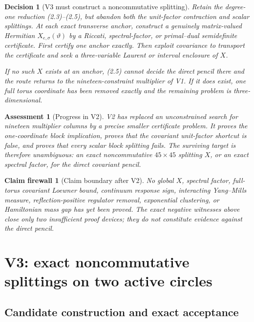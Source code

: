 \documentclass[11pt,oneside]{article}
\newtheorem{assessment}[theorem]{Assessment}
\newtheorem{firewall}[theorem]{Claim firewall}
\newtheorem{decision}[theorem]{Decision}
\theoremstyle{definition}
\theoremstyle{remark}
\begin{document}
\begin{decision}[V3 must construct a noncommutative splitting]
\label{dec:newv2-next}
Retain the degree-one reduction (2.3)--(2.5), but abandon both the
unit-factor contraction and scalar splittings.  At each exact
transverse anchor, construct a genuinely matrix-valued Hermitian
\(X_{e,\sigma}(\vartheta)\) by a Riccati, spectral-factor, or
primal--dual semidefinite certificate.  First certify one anchor
exactly.  Then exploit covariance to transport the certificate and
seek a three-variable Laurent or interval enclosure of \(X\).

If no such \(X\) exists at an anchor, (2.5) cannot decide the direct
pencil there and the route returns to the nineteen-constraint
multiplier of V1.  If it does exist, one full torus coordinate has
been removed exactly and the remaining problem is three-dimensional.
\end{decision}

\begin{assessment}[Progress in V2]
\label{ass:newv2-progress}
V2 has replaced an unconstrained search for nineteen multiplier
columns by a precise smaller certificate problem.  It proves the
one-coordinate block implication, proves that the covariant
unit-factor shortcut is false, and proves that every scalar block
splitting fails.  The surviving target is therefore unambiguous:
an exact noncommutative \(45\times45\) splitting \(X\), or an exact
spectral factor, for the direct covariant pencil.
\end{assessment}

\begin{firewall}[Claim boundary after V2]
\label{fire:newv2-final}
No global \(X\), spectral factor, full-torus covariant Loewner
bound, continuum response sign, interacting Yang--Mills measure,
reflection-positive regulator removal, exponential clustering, or
Hamiltonian mass gap has yet been proved.  The exact negative
witnesses above close only two insufficient proof devices; they do
not constitute evidence against the direct pencil.
\end{firewall}

\section{V3: exact noncommutative splittings on two active circles}
\label{sec:newv3-circles}

\subsection{Candidate construction and exact acceptance}
\end{document}
